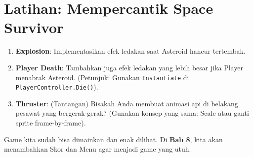 
\section{Latihan: Mempercantik Space Survivor}

\begin{enumerate}
    \item \textbf{Explosion}: Implementasikan efek ledakan saat Asteroid hancur tertembak.
    \item \textbf{Player Death}: Tambahkan juga efek ledakan yang lebih besar jika Player menabrak Asteroid. (Petunjuk: Gunakan \texttt{Instantiate} di \texttt{PlayerController.Die()}).
    \item \textbf{Thruster}: (Tantangan) Bisakah Anda membuat animasi api di belakang pesawat yang bergerak-gerak? (Gunakan konsep yang sama: Scale atau ganti sprite frame-by-frame).
\end{enumerate}

Game kita sudah bisa dimainkan dan enak dilihat. Di \textbf{Bab 8}, kita akan menambahkan Skor dan Menu agar menjadi game yang utuh.
